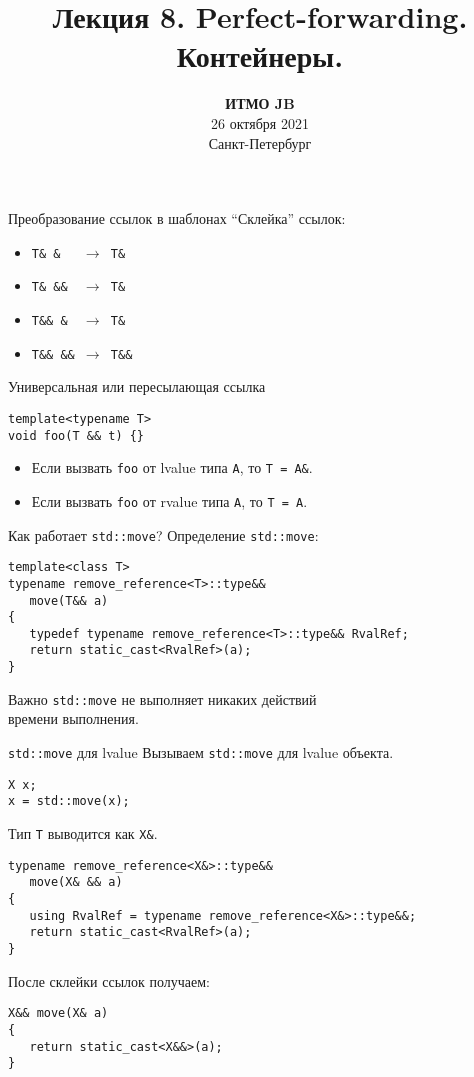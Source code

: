 \documentclass{beamer}
\title{Лекция 8. Perfect-forwarding. Контейнеры.}
\date{
   \textbf{ИТМО JB}\\
   26 октября 2021 \\
   Санкт-Петербург
}
\begin{document}
\begin{frame} 
  \titlepage
\end{frame}

\begin{frame}[fragile]{Преобразование ссылок в шаблонах}
    ``Склейка'' ссылок:
    \begin{itemize}
    \item \texttt{T\& \&\ \ \ $\to$ T\&}
    \item \texttt{T\& \&\&\ \  $\to$ T\&}
    \item \texttt{T\&\& \&\ \  $\to$ T\&}
    \item \texttt{T\&\& \&\&\  $\to$ T\&\&}
    \end{itemize}

\begin{block}{Универсальная или пересылающая ссылка}
\begin{lstlisting}
template<typename T>
void foo(T && t) {}
\end{lstlisting}
\begin{itemize}
    \item Если вызвать {\tt foo} от lvalue типа {\tt A}, то {\tt T = A\&}.
    \item Если вызвать {\tt foo} от rvalue типа {\tt A}, то {\tt T = A}.
\end{itemize}
\end{block}
\end{frame}

\begin{frame}[fragile]{Как работает {\tt std::move}?}
Определение \texttt{std::move}:
\begin{lstlisting}
template<class T> 
typename remove_reference<T>::type&&
   move(T&& a) 
{
   typedef typename remove_reference<T>::type&& RvalRef;
   return static_cast<RvalRef>(a);
}  
    \end{lstlisting}


\begin{block}{Важно}
    \texttt{std::move} не выполняет никаких действий\\
    времени выполнения.
\end{block}
\end{frame}

\begin{frame}[fragile]{{\tt std::move} для lvalue}
Вызываем \texttt{std::move} для lvalue объекта.
\begin{lstlisting}
X x;
x = std::move(x);
\end{lstlisting}
Тип \texttt{T} выводится как \texttt{X\&}.
    \begin{lstlisting}
typename remove_reference<X&>::type&&
   move(X& && a) 
{
   using RvalRef = typename remove_reference<X&>::type&&;
   return static_cast<RvalRef>(a);
} 
    \end{lstlisting}
После склейки ссылок получаем:
    \begin{lstlisting}
X&& move(X& a) 
{
   return static_cast<X&&>(a);
} 
    \end{lstlisting}
\end{frame}
\end{document}
